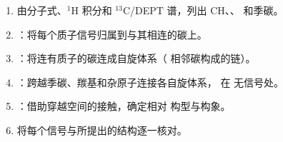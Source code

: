 \begin{method}[借助二维谱解析结构]\label{met:b3:advanced-nmr:solve-2d}
\begin{enumerate}
  \item 由分子式、${}^1$H 积分和 ${}^{13}$C/DEPT 谱，列出
        CH、、 和季碳。
  \item {}：将每个质子信号归属到与其相连的碳上。
  \item {}：将连有质子的碳连成自旋体系（
        相邻碳构成的链）。
  \item {}：跨越季碳、羰基和杂原子连接各自旋体系，
        在  无信号处。
  \item {}：借助穿越空间的接触，确定相对
        构型与构象。
  \item 将每个信号与所提出的结构逐一核对。
\end{enumerate}
\end{method}


